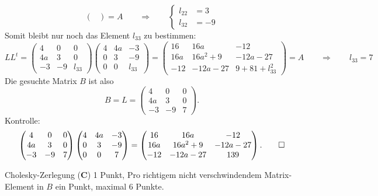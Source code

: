 \begin{loesung}
\[\begin{pmatrix}
\end{pmatrix}
=
A
\qquad\Rightarrow\qquad
\left\{
\begin{aligned}
l_{22}&=3\\
l_{32}&=-9
\end{aligned}
\right.
\]
Somit bleibt nur noch das Element $l_{33}$ zu bestimmen:
\[
LL^t=
\begin{pmatrix}
4&     0&0\\
4a&3&0\\
-3&-9&l_{33}
\end{pmatrix}
\begin{pmatrix}
4&    4a&    -3\\
0&3&-9\\
0&     0&l_{33}
\end{pmatrix}
=
\begin{pmatrix}
16&16a           &          -12\\
16a&16a^2+9  &-12a-27\\
-12&-12a-27&  9+81+l_{33}^2
\end{pmatrix}
=
A
\qquad\Rightarrow\qquad
l_{33}=7
\]
Die gesuchte Matrix $B$ ist also
\[
B = L=
\begin{pmatrix}
4&     0&0\\
4a&3&0\\
-3&-9&7
\end{pmatrix}.
\]
Kontrolle:
\[
\begin{pmatrix}
4&     0&0\\
4a&3&0\\
-3&-9&7
\end{pmatrix}
\begin{pmatrix}
4&    4a&    -3\\
0&3&-9\\
0&     0&7
\end{pmatrix}
=
\begin{pmatrix}
16& 16a&-12\\
16a&16a^2+9&-12a-27\\
-12& -12a-27&139
\end{pmatrix}.
\qedhere
\]
\end{loesung}

\begin{bewertung}
Cholesky-Zerlegung ({\bf C}) 1 Punkt,
Pro richtigem nicht verschwindendem Matrix-Element in $B$ ein Punkt,
maximal 6 Punkte.
\end{bewertung}

